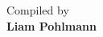 \begin{titlepage}
  \vspace{2.4cm}

  {
    \large\color{color_4} Compiled by}\\[0.4em]
  {
  \Large\bfseries\color{color_3} Liam Pohlmann}

  \vfill

  {
    \small\color{color_4} \the\year}

  \vspace{1.2cm}

\end{titlepage}
